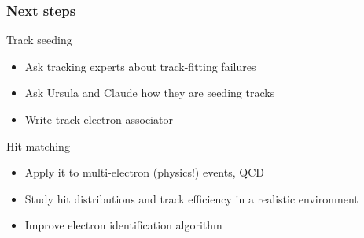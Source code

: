 \documentclass[12pt,compress]{beamer}
\begin{document}

\begin{frame}
\frametitle{Next steps}

Track seeding
\begin{itemize}\setlength{\itemsep}{0.25 cm}
\item Ask tracking experts about track-fitting failures
\item Ask Ursula and Claude how they are seeding tracks
\item Write track-electron associator
\end{itemize}

\vfill
Hit matching
\begin{itemize}\setlength{\itemsep}{0.25 cm}
\item Apply it to multi-electron (physics!) events, QCD
\item Study hit distributions and track efficiency in a realistic environment
\item Improve electron identification algorithm
\end{itemize}
\label{numpages}
\end{frame}






\end{document}
